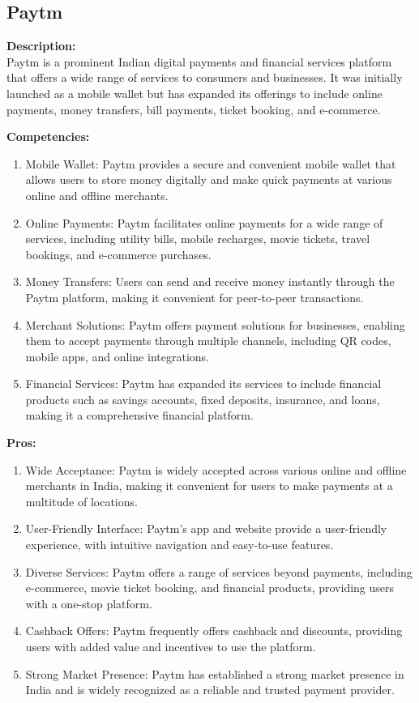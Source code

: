 \subsection{Paytm}

\textbf{Description:}\\
Paytm is a prominent Indian digital payments and financial services platform that offers a wide range of services to consumers and businesses. It was initially launched as a mobile wallet but has expanded its offerings to include online payments, money transfers, bill payments, ticket booking, and e-commerce.

\textbf{Competencies:}
\begin{enumerate}
  \item Mobile Wallet: Paytm provides a secure and convenient mobile wallet that allows users to store money digitally and make quick payments at various online and offline merchants.
  \item Online Payments: Paytm facilitates online payments for a wide range of services, including utility bills, mobile recharges, movie tickets, travel bookings, and e-commerce purchases.
  \item Money Transfers: Users can send and receive money instantly through the Paytm platform, making it convenient for peer-to-peer transactions.
  \item Merchant Solutions: Paytm offers payment solutions for businesses, enabling them to accept payments through multiple channels, including QR codes, mobile apps, and online integrations.
  \item Financial Services: Paytm has expanded its services to include financial products such as savings accounts, fixed deposits, insurance, and loans, making it a comprehensive financial platform.
\end{enumerate}

\textbf{Pros:}
\begin{enumerate}
  \item Wide Acceptance: Paytm is widely accepted across various online and offline merchants in India, making it convenient for users to make payments at a multitude of locations.
  \item User-Friendly Interface: Paytm's app and website provide a user-friendly experience, with intuitive navigation and easy-to-use features.
  \item Diverse Services: Paytm offers a range of services beyond payments, including e-commerce, movie ticket booking, and financial products, providing users with a one-stop platform.
  \item Cashback Offers: Paytm frequently offers cashback and discounts, providing users with added value and incentives to use the platform.
  \item Strong Market Presence: Paytm has established a strong market presence in India and is widely recognized as a reliable and trusted payment provider.
\end{enumerate}

